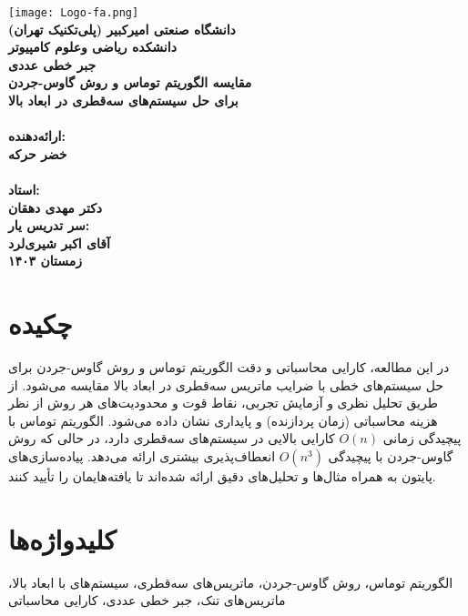 \documentclass[a4paper,12pt]{article}
\begin{document}
\begin{titlepage}
    \centering
    \texttt{[image: Logo-fa.png]} \\[1cm]
    \textbf{\Large{دانشگاه صنعتی امیرکبیر (پلی‌تکنیک تهران)}} \\[0.5cm]
    \textbf{\Large{دانشکده ریاضی وعلوم کامپیوتر}} \\[0.5cm]
    \textbf{\Large{جبر خطی عددی}} \\[0.5cm]
    \textbf{\huge{مقایسه الگوریتم توماس و روش گاوس-جردن}} \\[0.5cm]
    \textbf{\huge{برای حل سیستم‌های سه‌قطری در ابعاد بالا}} \\[0.5cm]
    \textbf{\Large{}} \\[0.8cm]
    \textbf{\Large{ارائه‌دهنده:}} \\[0.2cm]
    \textbf{\large{خضر حرکه}} \\[1cm]
    \textbf{\Large{}} \\[0.2cm]
    \textbf{\Large{استاد:}} \\[0.2cm]
    \textbf{\large{دکتر مهدی دهقان}} \\[1cm]
    \textbf{\Large{سر تدریس یار:}} \\[0.2cm]
    \textbf{\large{آقای اکبر شیری‌لرد}} \\[1cm]  
    \textbf{\Large{زمستان ۱۴۰۳}}
\end{titlepage}

\newpage
{}
\setcounter{page}{1}

\section*{چکیده}
در این مطالعه، کارایی محاسباتی و دقت الگوریتم توماس و روش گاوس-جردن برای حل سیستم‌های خطی با ضرایب ماتریس سه‌قطری در ابعاد بالا مقایسه می‌شود. از طریق تحلیل نظری و آزمایش تجربی، نقاط قوت و محدودیت‌های هر روش از نظر هزینه محاسباتی (زمان پردازنده) و پایداری نشان داده می‌شود. الگوریتم توماس با پیچیدگی زمانی \(O(n)\) کارایی بالایی در سیستم‌های سه‌قطری دارد، در حالی که روش گاوس-جردن با پیچیدگی \(O(n^3)\) انعطاف‌پذیری بیشتری ارائه می‌دهد. پیاده‌سازی‌های پایتون به همراه مثال‌ها و تحلیل‌های دقیق ارائه شده‌اند تا یافته‌هایمان را تأیید کنند.

\section*{کلیدواژه‌ها}
الگوریتم توماس، روش گاوس-جردن، ماتریس‌های سه‌قطری، سیستم‌های با ابعاد بالا، ماتریس‌های تنک، جبر خطی عددی، کارایی محاسباتی
\end{document}
